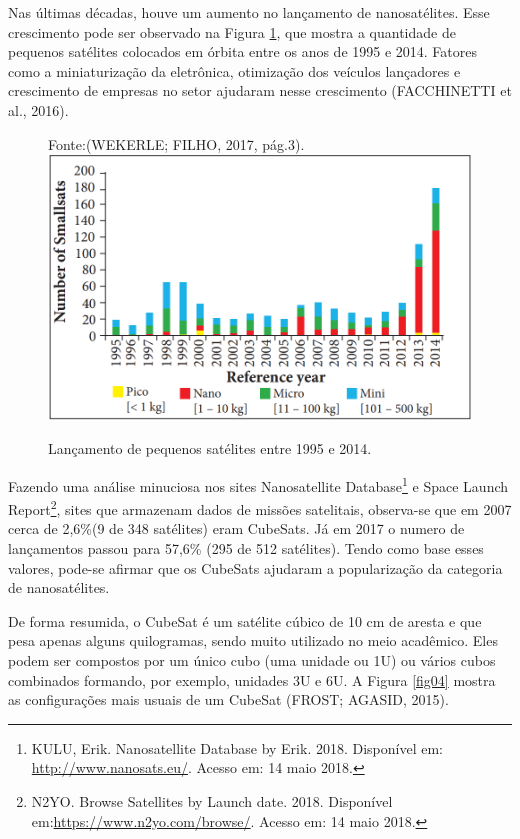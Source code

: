 Nas últimas décadas, houve um aumento no lançamento de nanosatélites. Esse crescimento pode ser observado na Figura \ref{fig03}, que mostra a quantidade de pequenos satélites colocados em órbita entre os anos de 1995 e 2014. Fatores como a miniaturização da eletrônica, otimização dos veículos lançadores e crescimento de empresas no setor ajudaram nesse crescimento (FACCHINETTI et al., 2016).

\begin{figure}[h]
	\centering
    Fonte:(WEKERLE; FILHO, 2017, pág.3).
	\includegraphics[keepaspectratio=true,scale=0.55]{figuras/lancamentoPequenoSatellite.PNG}
	\caption{Lançamento de pequenos satélites entre 1995 e 2014.}
	\label{fig03}
\end{figure}

Fazendo uma análise minuciosa nos sites Nanosatellite Database\footnote{ KULU, Erik. Nanosatellite Database by Erik. 2018. Disponível em: \url{http://www.nanosats.eu/}. Acesso em: 14 maio 2018.} e Space Launch Report\footnote{N2YO. Browse Satellites by Launch date. 2018. Disponível em:\url{https://www.n2yo.com/browse/}.  Acesso em: 14 maio 2018.}, sites que armazenam dados de missões satelitais, observa-se que em 2007 cerca de 2,6\%(9 de 348 satélites) eram CubeSats. Já em 2017 o numero de lançamentos passou para 57,6\% (295 de 512 satélites). Tendo como base esses valores, pode-se afirmar que os CubeSats ajudaram a popularização da categoria de nanosatélites.

De forma resumida, o CubeSat é um satélite cúbico de 10 cm de aresta e que pesa apenas alguns quilogramas, sendo muito utilizado no meio acadêmico. Eles podem ser compostos por um único cubo (uma unidade ou 1U) ou vários cubos combinados formando, por exemplo, unidades 3U e 6U. A Figura \ref{fig04} mostra as configurações mais usuais de um CubeSat (FROST; AGASID, 2015).


